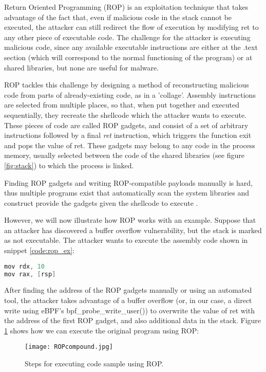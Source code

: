 Return Oriented Programming (ROP) is an exploitation technique that takes advantage of the fact that, even if malicious code in the stack cannot be executed, the attacker can still redirect the flow of execution by modifying ret to any other piece of executable code. The challenge for the attacker is executing malicious code, since any available executable instructions are either at the .text section (which will correspond to the normal functioning of the program) or at shared libraries, but none are useful for malware. 

ROP tackles this challenge by designing a method of reconstructing malicious code from parts of already-existing code, as in a 'collage'. Assembly instructions are selected from multiple places, so that, when put together and executed sequentially, they recreate the shellcode which the attacker wants to execute. These pieces of code are called ROP gadgets, and consist of a set of arbitrary instructions followed by a final \textit{ret} instruction, which triggers the function exit and pops the value of ret. These gadgets may belong to any code in the process memory, usually selected between the code of the shared libraries (see figure \ref{fig:stack}) to which the process is linked.

Finding ROP gadgets and writing ROP-compatible payloads manually is hard, thus multiple programs exist that automatically scan the system libraries and construct provide the gadgets given the shellcode to execute \cite{rop_prog_finder}.

However, we will now illustrate how ROP works with an example. Suppose that an attacker has discovered a buffer overflow vulnerability, but the stack is marked as not executable. The attacker wants to execute the assembly code shown in snippet \ref{code:rop_ex}:

\begin{lstlisting}[language=C, caption={Sample program to run using ROP.}, label={code:rop_ex}]
mov rdx, 10
mov rax, [rsp]
\end{lstlisting}

After finding the address of the ROP gadgets manually or using an automated tool, the attacker takes advantage of a buffer overflow (or, in our case, a direct write using eBPF's bpf\_probe\_write\_user()) to overwrite the value of ret with the address of the first ROP gadget, and also additional data in the stack. Figure \ref{fig:rop_compund} shows how we can execute the original program using ROP:

\begin{figure}[htbp]
	\centering
	\texttt{[image: ROPcompound.jpg]}
	\caption{Steps for executing code sample using ROP.}
	\label{fig:rop_compund}
\end{figure}

